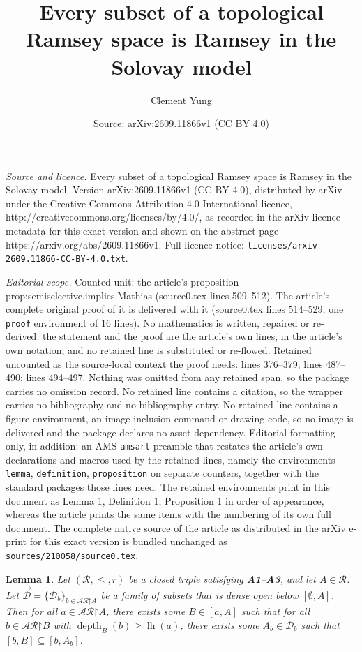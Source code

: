 \documentclass[10pt,a4paper]{amsart}
\title{Every subset of a topological Ramsey space is Ramsey in the Solovay model}
\author{Clement Yung}
\date{Source: arXiv:2609.11866v1 (CC BY 4.0)}
\newtheorem{lemma}{Lemma}
\newcommand{\D}{\cal{D}}
\newcommand{\cal}{\mathcal}
\newcommand{\depth}{\func{depth}}
\newcommand{\func}{\operatorname}
\newcommand{\lh}{\func{lh}}
\newcommand{\restrictedto}{\mathord{\upharpoonright}}
\begin{document}
\maketitle

\noindent\emph{Source and licence.} Every subset of a topological Ramsey space is Ramsey in the Solovay model. Version arXiv:2609.11866v1 (CC BY 4.0), distributed by arXiv under the Creative Commons Attribution 4.0 International licence, http://creativecommons.org/licenses/by/4.0/, as recorded in the arXiv licence metadata for this exact version and shown on the abstract page https://arxiv.org/abs/2609.11866v1. Full licence notice: \texttt{licenses/arxiv-2609.11866-CC-BY-4.0.txt}.\par\smallskip

\noindent\textit{Editorial scope.} Counted unit: the article's proposition prop:semiselective.implies.Mathias (source0.tex lines 509--512). The article's complete original proof of it is delivered with it (source0.tex lines 514--529, one \texttt{proof} environment of 16 lines). No mathematics is written, repaired or re-derived: the statement and the proof are the article's own lines, in the article's own notation, and no retained line is substituted or re-flowed.  Retained uncounted as the source-local context the proof needs: lines 376--379; lines 487--490; lines 494--497.  Nothing was omitted from any retained span, so the package carries no omission record.  No retained line contains a citation, so the wrapper carries no bibliography and no bibliography entry.  No retained line contains a figure environment, an image-inclusion command or drawing code, so no image is delivered and the package declares no asset dependency.  Editorial formatting only, in addition: an AMS \texttt{amsart} preamble that restates the article's own declarations and macros used by the retained lines, namely the environments \texttt{lemma}, \texttt{definition}, \texttt{proposition} on separate counters, together with the standard packages those lines need.  The retained environments print in this document as Lemma 1, Definition 1, Proposition 1 in order of appearance, whereas the article prints the same items with the numbering of its own full document.  The complete native source of the article as distributed in the arXiv e-print for this exact version is bundled unchanged as \texttt{sources/210058/source0.tex}.
\begin{lemma}
\label{lem:R.is.semiselective.improved}
    Let $(\cal{R},\leq,r)$ be a closed triple satisfying \textbf{A1}--\textbf{A3}, and let $A \in \cal{R}$. Let $\vec{\D} = \{\D_b\}_{b\in\cal{AR}\restrictedto A}$ be a family of subsets that is dense open below $[\emptyset,A]$. Then for all $a \in \cal{AR}\restrictedto A$, there exists some $B \in [a,A]$ such that for all $b \in \cal{AR}\restrictedto B$ with $\depth_B(b) \geq \lh(a)$, there exists some $A_b \in \D_b$ such that $[b,B] \subseteq [b,A_b]$.
\end{lemma}
\end{document}

